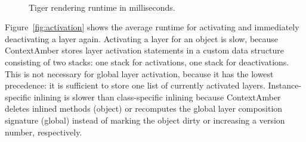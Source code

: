 \documentclass{sig-alternate}
\begin{document}
\begin{figure}[t]
    \centering
     \\
    \caption{Tiger rendering runtime in milliseconds.}
    \label{fig:rendering_runtime}
\end{figure}

Figure~\ref{fig:activation} shows the average runtime for activating and immediately deactivating a layer again. Activating a layer for an object is slow, because ContextAmber stores layer activation statements in a custom data structure consisting of two stacks: one stack for activations, one stack for deactivations. This is not necessary for global layer activation, because it has the lowest precedence: it is sufficient to store one list of currently
activated layers. Instance-specific inlining is slower than class-specific inlining because ContextAmber deletes inlined methods (object) or recomputes the global layer composition signature (global) instead of marking the object dirty or increasing a version number, respectively.
\end{document}
